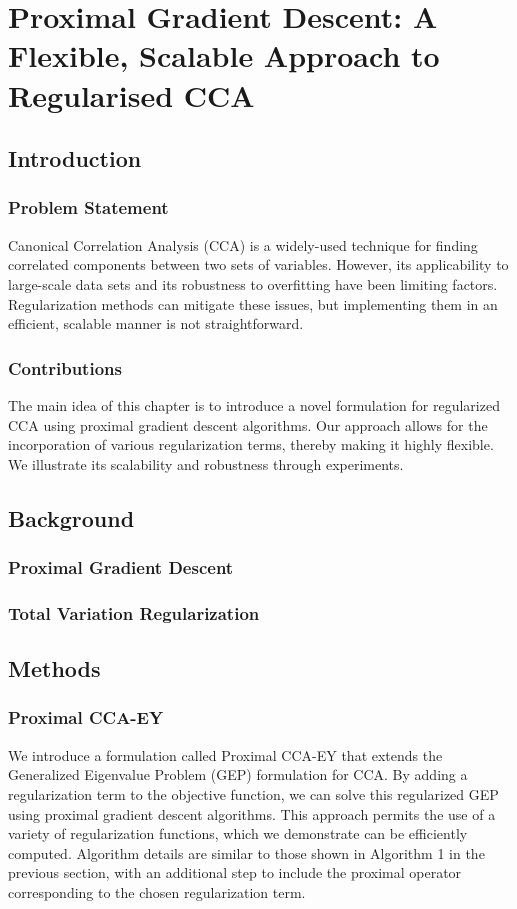 \chapter{Proximal Gradient Descent: A Flexible, Scalable Approach to Regularised CCA}
\label{Regularised}
\minitoc


\section{Introduction}

\subsection{Problem Statement}
Canonical Correlation Analysis (CCA) is a widely-used technique for finding correlated components between two sets of variables. However, its applicability to large-scale data sets and its robustness to overfitting have been limiting factors. Regularization methods can mitigate these issues, but implementing them in an efficient, scalable manner is not straightforward.

\subsection{Contributions}
The main idea of this chapter is to introduce a novel formulation for regularized CCA using proximal gradient descent algorithms. Our approach allows for the incorporation of various regularization terms, thereby making it highly flexible. We illustrate its scalability and robustness through experiments.

\section{Background}
\subsection{Proximal Gradient Descent}
\subsection{Total Variation Regularization}

\section{Methods}
\subsection{Proximal CCA-EY}
We introduce a formulation called Proximal CCA-EY that extends the Generalized Eigenvalue Problem (GEP) formulation for CCA. By adding a regularization term to the objective function, we can solve this regularized GEP using proximal gradient descent algorithms. This approach permits the use of a variety of regularization functions, which we demonstrate can be efficiently computed. Algorithm details are similar to those shown in Algorithm 1 in the previous section, with an additional step to include the proximal operator corresponding to the chosen regularization term.

